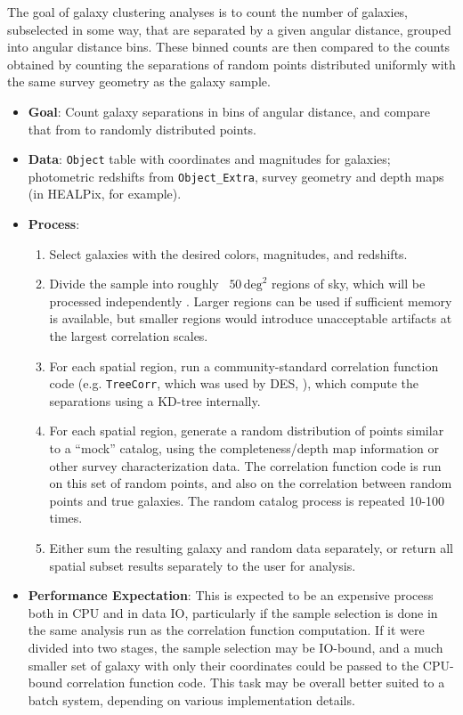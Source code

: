 \documentclass[DM,authoryear,toc]{lsstdoc}
\begin{document}
The goal of galaxy clustering analyses is to count the number of galaxies,
subselected in some way, that are separated by a given angular distance,
grouped into angular distance bins. These binned counts are then compared to
the counts obtained by counting the separations of random points distributed
uniformly with the same survey geometry as the galaxy sample. 

\begin{itemize}
  \item \textbf{Goal}: Count galaxy separations in bins of angular distance,
  and compare that from to randomly distributed points.
  \item \textbf{Data}: \texttt{Object} table with coordinates and magnitudes
  for galaxies; photometric redshifts from \texttt{Object\_Extra}, survey
  geometry and depth maps (in HEALPix, for example).
  \item \textbf{Process}: 
    \begin{enumerate}
      \item Select galaxies with the desired colors, magnitudes, and redshifts.
      \item Divide the sample into roughly ~$50 \, \textrm{deg}^2$ regions of
      sky, which will be processed independently
      \citep[c.f.][]{2017arXiv170801538T}. Larger regions can be used
      if sufficient memory is available, but smaller regions would introduce
      unacceptable artifacts at the largest correlation scales.
      \item For each spatial region, run a community-standard correlation
      function code (e.g. \texttt{TreeCorr}, which was used by DES,
      \citealt{2017arXiv170801536E}), which
      compute the separations using a KD-tree internally.
      \item For each spatial region, generate a random distribution of points
      similar to a ``mock'' catalog, using the completeness/depth map
      information or other survey characterization data. The correlation
      function code is run on this set of random points, and also on the
      correlation between random points and true galaxies. The random catalog process is repeated 10-100 times.
      \item Either sum the resulting galaxy and random data separately, or
      return all spatial subset results separately to the user for analysis.
    \end{enumerate}
  \item \textbf{Performance Expectation}: This is expected to be an expensive
  process both in CPU and in data IO, particularly if the sample selection is
  done in the same analysis run as the correlation function computation. If
  it were divided into two stages, the sample selection may be IO-bound, and a
  much smaller set of galaxy with only their coordinates could be passed to
  the CPU-bound correlation function code. This task may be overall better
  suited to a batch system, depending on various implementation details.
\end{itemize}
\end{document}
